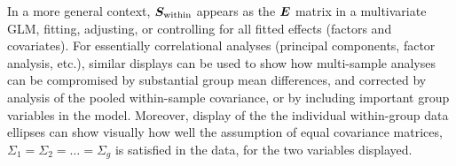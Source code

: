In a more general context, $ \bm{S}_{\textrm{within}}$
appears as the $\bm{E}$ matrix in a multivariate
GLM, fitting, adjusting, or controlling for all fitted effects (factors and covariates).
For essentially correlational analyses (principal components,
factor analysis, etc.),
similar displays can be used to show how multi-sample analyses
can be compromised by substantial group mean differences, and corrected
by analysis of the pooled within-sample covariance, or by 
including important group variables in the model.
Moreover, display of the the individual within-group data ellipses can
show visually how well the assumption of
equal covariance matrices,
$\Sigma_1 = \Sigma_2 = \dots = \Sigma_g$
is satisfied in the data, for the two variables
displayed.

